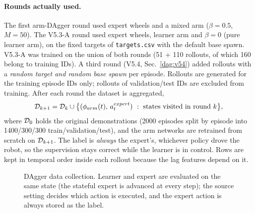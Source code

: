 \paragraph{Rounds actually used.} The first arm-DAgger round used expert wheels and a mixed arm ($\beta=0.5$, $M=50$). The V5.3-A round used expert wheels, learner arm and $\beta=0$ (pure learner arm), on the fixed targets of \texttt{targets.csv} with the default base spawn. V5.3-A was trained on the union of both rounds (51 + 110 rollouts, of which 160 belong to training IDs). A third round (V5.4, Sec.~\ref{dag:v54}) added rollouts with a \emph{random target and random base spawn} per episode. Rollouts are generated for the training episode IDs only; rollouts of validation/test IDs are excluded from training. After each round the dataset is aggregated,
\begin{equation}
  \dagD_{k+1}=\dagD_{k}\cup\bigl\{(\phi_{arm}(t),\,a_t^{expert})\ :\ \text{states visited in round }k\bigr\},
  \label{dag:agg}
\end{equation}
where $\mathcal{D}_0$ holds the original demonstrations (2000 episodes split by episode into 1400/300/300 train/validation/test), and the arm networks are retrained from scratch on $\mathcal{D}_{k+1}$. The label is \emph{always} the expert's, whichever policy drove the robot, so the supervision stays correct while the learner is in control. Rows are kept in temporal order inside each rollout because the lag features depend on it.

\begin{figure}[ht]
\centering
{}
\caption{DAgger data collection. Learner and expert are evaluated on the same state (the stateful expert is advanced at every step); the source setting decides which action is executed, and the expert action is always stored as the label.}
\label{dag:fig}
\end{figure}

